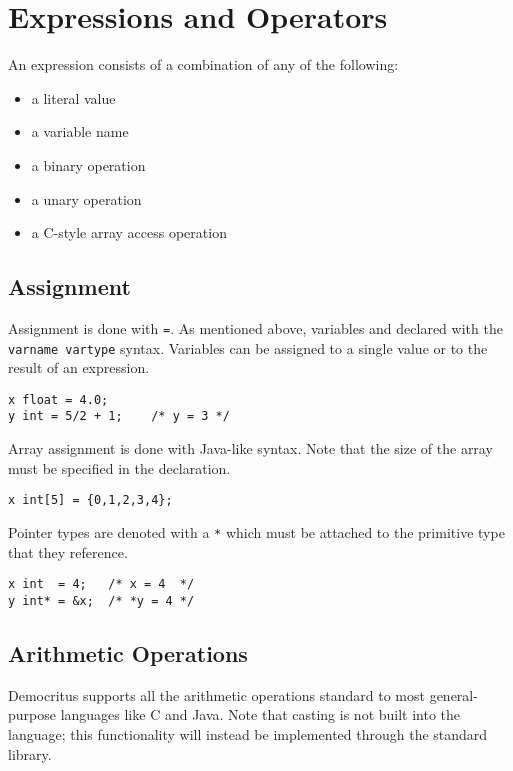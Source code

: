 \chapter{Expressions and Operators}
	An expression consists of a combination of any of the following:
    \begin{itemize}
        \item a literal value
        \item a variable name
        \item a binary operation
        \item a unary operation
        \item a C-style array access operation
    \end{itemize}
    \section{Assignment}
		Assignment is done with \texttt{=}. As mentioned above, variables and declared with the \texttt{varname vartype} syntax. Variables can be assigned to a single value or to the result of an expression. 
		
		\begin{lstlisting}
x float = 4.0;
y int = 5/2 + 1; 	/* y = 3 */
		\end{lstlisting}
		
		\noindent Array assignment is done with Java-like syntax. Note that the size of the array must be specified in the declaration. 
		
		\begin{lstlisting}
x int[5] = {0,1,2,3,4};
		\end{lstlisting}
		
		\noindent Pointer types are denoted with a \texttt{*} which must be attached to the primitive type that they reference.
		
		\begin{lstlisting}
x int  = 4;   /* x = 4  */
y int* = &x;  /* *y = 4 */
		\end{lstlisting}
		
	\section{Arithmetic Operations}
		Democritus supports all the arithmetic operations standard to most general-purpose languages like C and Java. Note that casting is not built into the language; this functionality will instead be implemented through the standard library.
		
